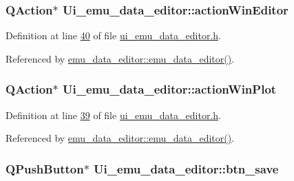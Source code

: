 \hypertarget{a00026_aa5d56420958ab4fd1239e29714d75e18}{
\subsubsection[{action\+Win\+Editor}]{\setlength{\rightskip}{0pt plus 5cm}Q\+Action$\ast$ Ui\+\_\+emu\+\_\+data\+\_\+editor\+::action\+Win\+Editor}}\label{a00026_aa5d56420958ab4fd1239e29714d75e18}


Definition at line \hyperlink{a00051_source_l00040}{40} of file \hyperlink{a00051_source}{ui\+\_\+emu\+\_\+data\+\_\+editor.\+h}.



Referenced by \hyperlink{a00035_source_l00012}{emu\+\_\+data\+\_\+editor\+::emu\+\_\+data\+\_\+editor()}.

\hypertarget{a00026_a0aeb289d8df9db6f4329e9000e44d511}{
\subsubsection[{action\+Win\+Plot}]{\setlength{\rightskip}{0pt plus 5cm}Q\+Action$\ast$ Ui\+\_\+emu\+\_\+data\+\_\+editor\+::action\+Win\+Plot}}\label{a00026_a0aeb289d8df9db6f4329e9000e44d511}


Definition at line \hyperlink{a00051_source_l00039}{39} of file \hyperlink{a00051_source}{ui\+\_\+emu\+\_\+data\+\_\+editor.\+h}.



Referenced by \hyperlink{a00035_source_l00012}{emu\+\_\+data\+\_\+editor\+::emu\+\_\+data\+\_\+editor()}.

\hypertarget{a00026_a3b0808ff0825375685673655eb4785fc}{
\subsubsection[{btn\+\_\+save}]{\setlength{\rightskip}{0pt plus 5cm}Q\+Push\+Button$\ast$ Ui\+\_\+emu\+\_\+data\+\_\+editor\+::btn\+\_\+save}}\label{a00026_a3b0808ff0825375685673655eb4785fc}


